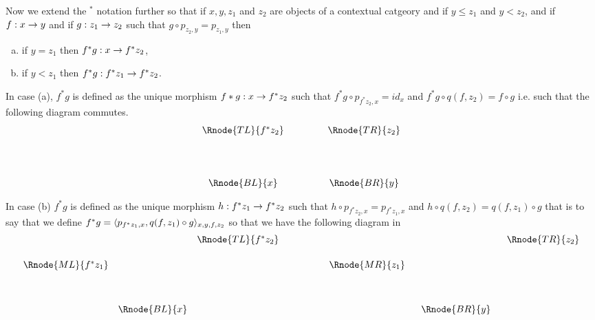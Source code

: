 Now we extend the $^*$ notation further so that if $x,y,z_1$ and $z_2$ are objects of a contextual catgeory \catcw 
and if $y \leq z_1$ and $y < z_2$, and if  $f:x\morph y$ and if $g: z_1 \morph z_2$ such that $g \circ p_{z_2,y} = p_{z_1,y}$
then
\begin{enumerate} [(a)]
\item if $y=z_1$ then $f^*g: x \morph f^*z_2$,
\item if $y < z_1$ then $f^*g:f^*z_1 \morph f^*z_2$.
\end{enumerate}

In case (a), $f^*g$ is defined as the unique morphism $f*g : x \morph f^*z_2$ such that $f^*g \circ p_{f^*z_2,x} = id_x$
and $f^*g \circ q(f,z_2) = f \circ g$ i.e. such that the following diagram commutes.
$$
\begin{array}{cp{.9cm}c}
\Rnode{TL}{f^*z_2} & &  \Rnode{TR}{z_2}\ \\ [1.5cm]
\Rnode{BL}{x}      & &  \Rnode{BR}{y}  
\end{array}
$$


In case (b) $f^*g$ is defined
as the unique morphism $h:f^*z_1 \morph f^*z_2$ such that
$h \circ p_{f^*z_2,x} = p_{f^*z_1,x}$ and $h \circ q(f,z_2) = q(f,z_1)\circ g$
that is to say that we define $f^*g=\pbpair{x,y,f,z_2}{p_{f^*z_1,x},q(f,z_1)\circ g} $
so that we have the following diagram in \catc
$$
\begin{array}{cccp{.9cm}ccc}
                   &               &\Rnode{TL}{f^*z_2} & &                &                & \ \ \Rnode{TR}{z_2}\ \\ [0.5cm]
\Rnode{ML}{f^*z_1} &               &                   & &\ \ \Rnode{MR}{z_1}\ \ &                &               \\ [1.2cm]
                   & \Rnode{BL}{x} &                   & &                & \Rnode{BR}{y}  &
\end{array}
$$

